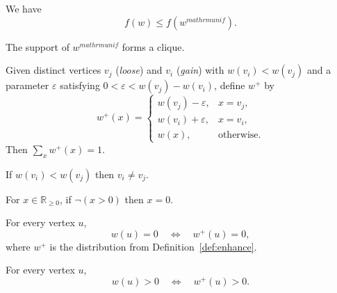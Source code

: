 \begin{lemma}\label{lem:uniformbetter-fw-ge}
\leanok
{}
We have
\[
  f(w) \le f(w^{mathrm{unif}}).
\]
\end{lemma}

\begin{lemma}\label{lem:uniformbetter-clique}
\leanok
{}
The support of $w^{mathrm{unif}}$ forms a clique.
\end{lemma}

\begin{definition}\label{def:enhance}
\leanok
\uses{}
Given distinct vertices $v_j$ (\emph{loose}) and $v_i$ (\emph{gain}) with
$w(v_i)<w(v_j)$ and a parameter $\varepsilon$ satisfying
$0<\varepsilon<w(v_j)-w(v_i)$, define $w^+$ by
\[
  w^+(x)=
  \begin{cases}
    w(v_j)-\varepsilon,& x=v_j,\\
    w(v_i)+\varepsilon,& x=v_i,\\
    w(x),& \text{otherwise.}
  \end{cases}
\]
Then $\sum_x w^+(x)=1$.
\end{definition}

\begin{lemma}\label{lem:neq-of-W-lt}
\leanok
\uses{}
If $w(v_i)<w(v_j)$ then $v_i\neq v_j$.
\end{lemma}

\begin{lemma}\label{lem:nnreal-eq-zero-of-ne-pos}
\leanok
\uses{}
For $x\in\mathbb{R}_{\ge0}$, if $\neg(x>0)$ then $x=0$.
\end{lemma}

\begin{lemma}\label{lem:enhance-nsupport-unchanged}
\leanok
{}
For every vertex $u$,
\[
  w(u)=0\quad\Longleftrightarrow\quad w^+(u)=0,
\]
where $w^+$ is the distribution from Definition~\ref{def:enhance}.
\end{lemma}

\begin{lemma}\label{lem:enhance-support-unchanged}
\leanok
{}
For every vertex $u$,
\[
  w(u)>0\quad\Longleftrightarrow\quad w^+(u)>0.
\]
\end{lemma}

